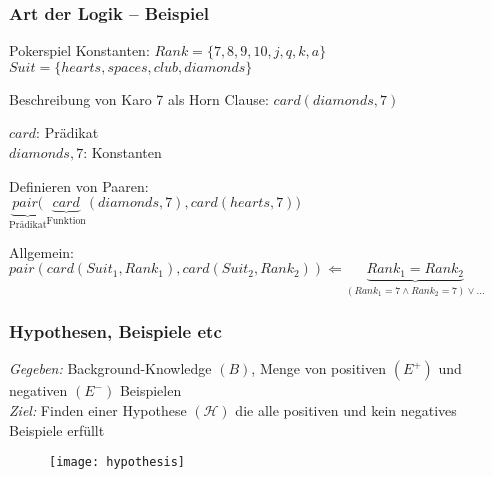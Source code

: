 \begin{frame}
	\frametitle{Art der Logik -- Beispiel}

	\begin{block}{Pokerspiel}
	Konstanten: $Rank = \{7,8,9,10,j,q,k,a\}$\\
	            $Suit = \{hearts, spaces, club, diamonds\}$
	
	Beschreibung von Karo 7 als Horn Clause: $card(diamonds, 7)$

	$card$: Prädikat\\
	$diamonds, 7$: Konstanten

	Definieren von Paaren:\\
	$\underbrace{pair(}_{\text{Prädikat}}\underbrace{card}_{\text{Funktion}}(diamonds, 7),
	card(hearts, 7))$

	Allgemein:\\
	$pair(card(Suit_1, Rank_1),card(Suit_2, Rank_2)) \Leftarrow \underbrace{Rank_1 =
	Rank_2}_{(Rank_1=7 \wedge Rank_2=7) \vee \ldots}$

	\end{block}
	
\end{frame}

\begin{frame}
\frametitle{Hypothesen, Beispiele etc}
	\emph{Gegeben:} Background-Knowledge $(B)$, Menge von positiven $(E^+)$ und negativen $(E^-)$ Beispielen\\
	\emph{Ziel:} Finden einer Hypothese $(\mathcal{H})$ die alle positiven und kein negatives Beispiele erfüllt
\begin{figure}[H]
	\centering
	\texttt{[image: hypothesis]}
\end{figure}
\end{frame}
